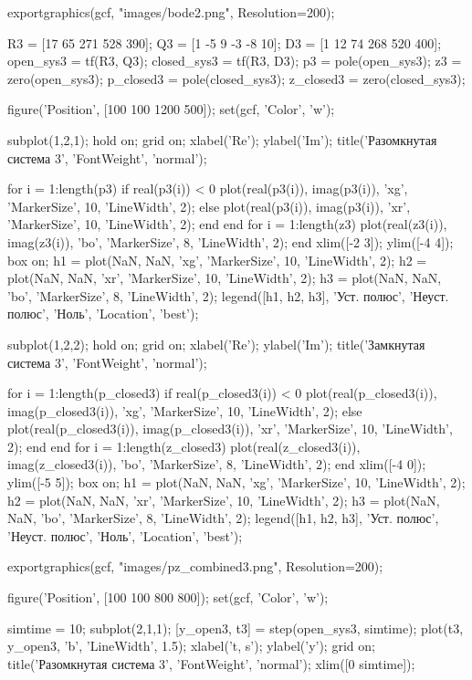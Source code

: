 \begin{matlabcode}
exportgraphics(gcf, "images/bode2.png", Resolution=200);

R3 = [17 65 271 528 390];
Q3 = [1 -5 9 -3 -8 10];
D3 = [1 12 74 268 520 400];
open_sys3 = tf(R3, Q3);
closed_sys3 = tf(R3, D3);
p3 = pole(open_sys3);
z3 = zero(open_sys3);
p_closed3 = pole(closed_sys3);
z_closed3 = zero(closed_sys3);



figure('Position', [100 100 1200 500]);
set(gcf, 'Color', 'w');

subplot(1,2,1);
hold on;
grid on;
xlabel('Re');
ylabel('Im');
title('Разомкнутая система 3', 'FontWeight', 'normal');

for i = 1:length(p3)
    if real(p3(i)) < 0
        plot(real(p3(i)), imag(p3(i)), 'xg', 'MarkerSize', 10, 'LineWidth', 2);
    else
        plot(real(p3(i)), imag(p3(i)), 'xr', 'MarkerSize', 10, 'LineWidth', 2);
    end
end
for i = 1:length(z3)
    plot(real(z3(i)), imag(z3(i)), 'bo', 'MarkerSize', 8, 'LineWidth', 2);
end
xlim([-2 3]);
ylim([-4 4]);
box on;
h1 = plot(NaN, NaN, 'xg', 'MarkerSize', 10, 'LineWidth', 2);
h2 = plot(NaN, NaN, 'xr', 'MarkerSize', 10, 'LineWidth', 2);
h3 = plot(NaN, NaN, 'bo', 'MarkerSize', 8, 'LineWidth', 2);
legend([h1, h2, h3], {'Уст. полюс', 'Неуст. полюс', 'Ноль'}, 'Location', 'best');

subplot(1,2,2);
hold on;
grid on;
xlabel('Re');
ylabel('Im');
title('Замкнутая система 3', 'FontWeight', 'normal');

for i = 1:length(p_closed3)
    if real(p_closed3(i)) < 0
        plot(real(p_closed3(i)), imag(p_closed3(i)), 'xg', 'MarkerSize', 10, 'LineWidth', 2);
    else
        plot(real(p_closed3(i)), imag(p_closed3(i)), 'xr', 'MarkerSize', 10, 'LineWidth', 2);
    end
end
for i = 1:length(z_closed3)
    plot(real(z_closed3(i)), imag(z_closed3(i)), 'bo', 'MarkerSize', 8, 'LineWidth', 2);
end
xlim([-4 0]);
ylim([-5 5]);
box on;
h1 = plot(NaN, NaN, 'xg', 'MarkerSize', 10, 'LineWidth', 2);
h2 = plot(NaN, NaN, 'xr', 'MarkerSize', 10, 'LineWidth', 2);
h3 = plot(NaN, NaN, 'bo', 'MarkerSize', 8, 'LineWidth', 2);
legend([h1, h2, h3], {'Уст. полюс', 'Неуст. полюс', 'Ноль'}, 'Location', 'best');

exportgraphics(gcf, "images/pz_combined3.png", Resolution=200);

figure('Position', [100 100 800 800]);
set(gcf, 'Color', 'w');

simtime = 10;
subplot(2,1,1);
[y_open3, t3] = step(open_sys3, simtime);
plot(t3, y_open3, 'b', 'LineWidth', 1.5);
xlabel('t, s');
ylabel('y');
grid on;
title('Разомкнутая система 3', 'FontWeight', 'normal');
xlim([0 simtime]);


\end{matlabcode}
